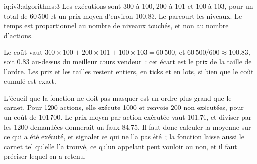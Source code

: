 \begin{solution}{iq:iv3:algorithms:3}
Les exécutions sont 300 à 100, 200 à 101 et 100 à 103, pour un total de 60\,500 et un prix moyen d'environ 100.83. Le  parcourt les niveaux. Le temps est proportionnel au nombre de niveaux touchés, et non au nombre d'actions.
\label{lst:iv3:al:sweep}

Le coût vaut $300 \times 100 + 200 \times 101 + 100 \times 103 = 60\,500$, et $60\,500 / 600 \approx 100.83$, soit 0.83 au-dessus du meilleur cours vendeur~: cet écart est le prix de la taille de l'ordre. Les prix et les tailles restent entiers, en ticks et en lots, si bien que le coût cumulé est exact.

L'écueil que la fonction ne doit pas masquer est un ordre plus grand que le carnet. Pour 1200 actions, elle exécute 1000 et renvoie 200 non exécutées, pour un coût de 101\,700. Le prix moyen par action exécutée vaut 101.70, et diviser par les 1200 demandées donnerait un faux 84.75. Il faut donc calculer la moyenne sur ce qui a été exécuté, et signaler ce qui ne l'a pas été~; la fonction laisse aussi le carnet tel qu'elle l'a trouvé, ce qu'un appelant peut vouloir ou non, et il faut préciser lequel on a retenu.

\end{solution}

